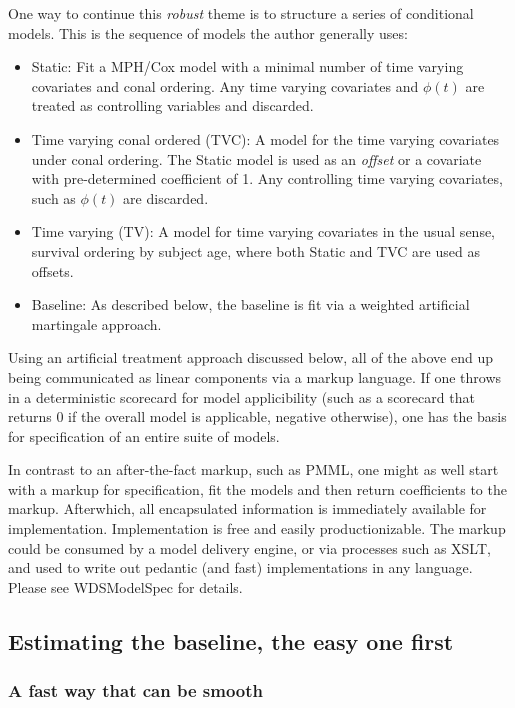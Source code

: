 \documentclass[10pt]{article}
\begin{document}
One way to continue this {\em robust} theme is to structure a series of conditional models.  This is the sequence of 
models the author generally uses:
\begin{itemize}
\item Static:  Fit a MPH/Cox model with a minimal number of time varying covariates and conal ordering.  Any time varying covariates and $\phi(t)$ 
    are treated as controlling variables and discarded.
\item Time varying conal ordered (TVC):
    A model for the time varying covariates under conal ordering.
    The Static model is used as an {\em offset} or a covariate with pre-determined coefficient of 1.
        Any controlling time varying covariates, such as $\phi(t)$ are discarded.
\item Time varying (TV): 
    A model for time varying covariates in the usual sense, survival ordering by subject age, where both Static and TVC are used as offsets.
\item Baseline:
    As described below, the baseline is fit via a weighted artificial martingale approach. 
\end{itemize}

Using an artificial treatment approach discussed below, all of the above end up being communicated as linear components via a
markup language.  If one throws in a deterministic scorecard for model applicibility (such as a scorecard that returns 0 if the overall model is
applicable, negative otherwise), one has the basis for specification of an entire suite of models.  

In contrast to an after-the-fact markup, such as PMML, one might as well start with a markup for specification, fit the models and then return coefficients to the markup.  
Afterwhich, all encapsulated information is immediately available for implementation.  
Implementation is free and easily productionizable.  The markup could be consumed by a model delivery engine, or via processes such as  XSLT,
and used to write out pedantic (and fast) implementations in any language.  Please see WDSModelSpec for details.

\subsection{Estimating the baseline, the easy one first}

\subsubsection{A fast way that can be smooth}
\end{document}
